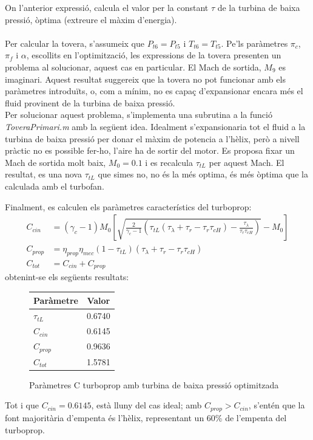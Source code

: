 \noindent On l'anterior expressió, calcula el valor per la constant $\tau$ de la turbina de baixa pressió, òptima (extreure el màxim d'energia).\\
\\
Per calcular la tovera, s'assumeix que $P_{t6}=P_{t5}$ i $T_{t6}=T_{t5}$. Pe'ls paràmetres $\pi_c$, $\pi_f$ i $\alpha$, escollits en l'optimització, les expressions de la tovera presenten un problema al solucionar, aquest cas en particular. El Mach de sortida, $M_9$ es imaginari. Aquest resultat suggereix que la tovera no pot funcionar amb els paràmetres introduïts, o, com a mínim, no es capaç d'expansionar encara més el fluid provinent de la turbina de baixa pressió.\\

\noindent Per solucionar aquest problema, s'implementa una subrutina a la funció \textit{ToveraPrimari.m} amb la següent idea. Idealment s'expansionaria tot el fluid a la turbina de baixa pressió per donar el màxim de potencia a l'hèlix, però a nivell pràctic no es possible fer-ho, l'aire ha de sortir del motor. Es proposa fixar un Mach de sortida molt baix, $M_0 = 0.1$ i es recalcula $\tau_{tL}$ per aquest Mach. El resultat, es una nova $\tau_{tL}$ que simes no, no és la més optima, és més òptima que la calculada amb el turbofan.

Finalment, es calculen els paràmetres característics del turboprop:
	\begin{align}
	C_{cin} &= (\gamma_c-1)M_0\left[\sqrt{\frac{2}{\gamma_c-1}\left(\tau_{tL}(\tau_{\lambda}+\tau_r-\tau_r\tau_{cH})-\frac{\tau_{\lambda}}{\tau_r\tau_{cH}}\right)}-M_0\right] \label{turboprop_eqn1}\\
	C_{prop} &= \eta_{prop}\eta_{mec}(1-\tau_{tL})(\tau_\lambda+\tau_r-\tau_r\tau_{cH}) \label{turboprop_eqn2}\\
	C_{tot} &= C_{cin} + C_{prop} \label{turboprop_eqn3}
	\end{align}
obtenint-se els següents resultats:
\begin{figure}[H]
	\centering
	\begin{tabular}{lc}
		\toprule[3pt]
		\textbf{Paràmetre}&\textbf{Valor}\\
		\midrule[1pt]
		$\tau_{tL}$ & 0.6740\\
		$C_{cin}$ & 0.6145\\
		$C_{prop}$ & 0.9636\\
		$C_{tot}$ & 1.5781\\
		
		\bottomrule[2pt]
	\end{tabular}
\label{C_opti}
\caption{Paràmetres C turboprop amb turbina de baixa pressió optimitzada}
\end{figure}
\noindent Tot i que $C_{cin}=0.6145$, està lluny del cas ideal; amb $C_{prop}>C_{cin}$, s'entén que la font majoritària d'empenta és l'hèlix, representant un 60\% de l'empenta del turboprop.

